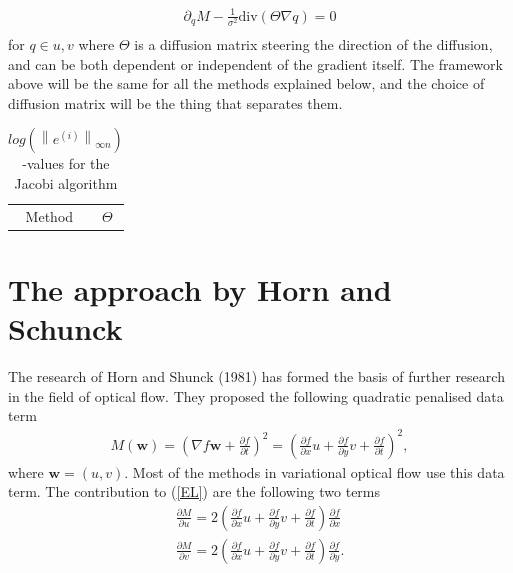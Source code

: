 \documentclass[10pt,a4paper]{article}
\newcommand{\vectornorm}[1]{\left\|#1\right\|}
\begin{document}
\begin{equation}
\label{EL_regu}
  \begin{aligned}
\partial_q M - \frac{1}{\sigma^2} \text{div} \left(\Theta \nabla q \right) = 0 \\
	\end{aligned}
\end{equation}
for $q \in u, v$ where $\Theta$ is a diffusion matrix steering the direction of the diffusion, and can be both dependent or independent of the gradient itself. The framework above will be the same for all the methods explained below, and the choice of diffusion matrix will be the thing that separates them. 

\begin{table}
\begin{tabular}{c|c}
Method & $\Theta$
\end{tabular}
\caption{$log(\vectornorm{e^{(i)}}_{\infty n})$-values for the Jacobi algorithm }
\label{nvalues}
\end{table}

\section{The approach by Horn and Schunck}
The research of Horn and Shunck (1981) has formed the basis of further research in the field of optical flow. They proposed the following quadratic penalised data term
\begin{align}
M(\textbf{w}) = (\nabla f \textbf{w} + \frac{\partial f}{\partial t})^2 = (\frac{\partial f}{\partial x} u + \frac{\partial f}{\partial y} v + \frac{\partial f}{\partial t})^2,
\end{align}
where $\textbf{w} = (u,v)$. Most of the methods in variational optical flow use this data term. The contribution to (\ref{EL}) are the following two terms
\begin{equation}
\begin{aligned}
\frac{\partial M}{\partial u} = 2(\frac{\partial f}{\partial x}u + \frac{\partial f}{\partial y}v + \frac{\partial f}{\partial t}) \frac{\partial f}{\partial x} \\
\frac{\partial M}{\partial v} = 2(\frac{\partial f}{\partial x}u + \frac{\partial f}{\partial y}v + \frac{\partial f}{\partial t}) \frac{\partial f}{\partial y}. \\
\end{aligned}
\end{equation}
\end{document}
